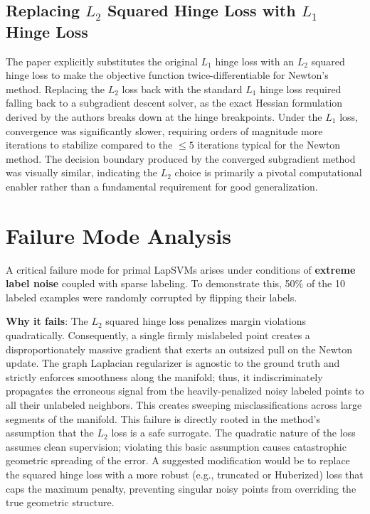 \documentclass[conference]{IEEEtran}
\begin{document}
\subsection{Replacing $L_2$ Squared Hinge Loss with $L_1$ Hinge Loss}
The paper explicitly substitutes the original $L_1$ hinge loss with an $L_2$ squared hinge loss to make the objective function twice-differentiable for Newton's method. Replacing the $L_2$ loss back with the standard $L_1$ hinge loss required falling back to a subgradient descent solver, as the exact Hessian formulation derived by the authors breaks down at the hinge breakpoints. Under the $L_1$ loss, convergence was significantly slower, requiring orders of magnitude more iterations to stabilize compared to the $\leq 5$ iterations typical for the Newton method. The decision boundary produced by the converged subgradient method was visually similar, indicating the $L_2$ choice is primarily a pivotal computational enabler rather than a fundamental requirement for good generalization.

\section{Failure Mode Analysis}
A critical failure mode for primal LapSVMs arises under conditions of \textbf{extreme label noise} coupled with sparse labeling. To demonstrate this, 50\% of the 10 labeled examples were randomly corrupted by flipping their labels. 

\textbf{Why it fails}: The $L_2$ squared hinge loss penalizes margin violations quadratically. Consequently, a single firmly mislabeled point creates a disproportionately massive gradient that exerts an outsized pull on the Newton update. The graph Laplacian regularizer is agnostic to the ground truth and strictly enforces smoothness along the manifold; thus, it indiscriminately propagates the erroneous signal from the heavily-penalized noisy labeled points to all their unlabeled neighbors. This creates sweeping misclassifications across large segments of the manifold. This failure is directly rooted in the method's assumption that the $L_2$ loss is a safe surrogate. The quadratic nature of the loss assumes clean supervision; violating this basic assumption causes catastrophic geometric spreading of the error. A suggested modification would be to replace the squared hinge loss with a more robust (e.g., truncated or Huberized) loss that caps the maximum penalty, preventing singular noisy points from overriding the true geometric structure.
\end{document}
